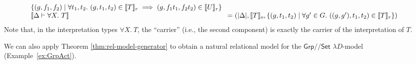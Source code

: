 \documentclass[a4paper,UKenglish]{lipics}
\theoremstyle{plain}
\newcommand{\msf}[1]{\mathsf{#1}} %
\newcommand{\Grp}{\msf{Grp}}
\newcommand{\Set}{\msf{Set}}
\newcommand{\Lslice}[1]{#1/\!/\Set}
\newcommand{\GrpSet}{\Lslice{\Grp}}
\newcommand{\sem}[1]{\ensuremath{\llbracket #1 \rrbracket}}
\newcommand{\semo}[1]{\ensuremath{\llbracket #1 \rrbracket _o}}
\newcommand{\semr}[1]{\ensuremath{\llbracket #1 \rrbracket _r}}
\begin{document}
\begin{example}
\begin{displaymath}
\begin{array}{l@{\hspace{0.3em}}c@{\hspace{0.3em}}l}
\begin{array}[t]{@{}l}
        \{ (g, f_1, f_2) \mathrel| \forall t_1, t_2.~(g,t_1,t_2) \in \semr{T} \implies (g,f_1t_1, f_2t_2) \in \semr{U} \}
      \end{array}
      \\
      \sem{\Delta \vdash \forall X.~T} & = & (|\Delta|,
      \begin{array}[t]{@{}l}
        \semo{T},
        \{ (g, t_1, t_2) \mathrel| \forall g' \in G.~((g,g'), t_1, t_2) \in \semr{T} \} )
      \end{array}
    \end{array}
  \end{displaymath}
Note that, in the interpretation types $\forall X.~T$, the ``carrier'' (i.e., the second component) is exactly the carrier of the interpretation of $T$.
\end{example}

We can also apply Theorem \ref{thm:rel-model-generator} to obtain a natural relational model for the $\GrpSet$ $\lambda D$-model (Example~\ref{ex:GrpAct}).
\end{document}
